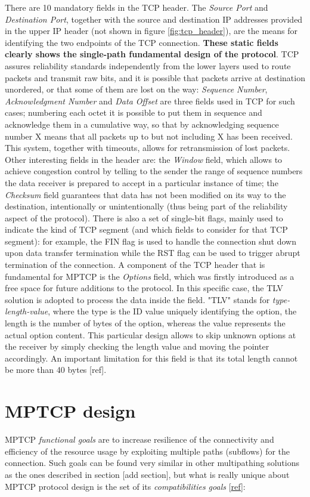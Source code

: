 There are 10 mandatory fields in the TCP header.
The \textit{Source Port} and \textit{Destination Port}, together with the source and destination IP addresses provided in the upper IP header (not shown in figure \ref{fig:tcp_header}), are the means for identifying the two endpoints of the TCP connection. \textbf{These static fields clearly shows the single-path fundamental design of the protocol}. 
TCP assures reliability standards independently from the lower layers used to route packets and transmit raw bits, and it is possible that packets arrive at destination unordered, or that some of them are lost on the way: \textit{Sequence Number}, \textit{Acknowledgment Number} and \textit{Data Offset} are three fields used in TCP for such cases; numbering each octet it is possible to put them in sequence and acknowledge them in a cumulative way, so that by acknowledging sequence number X means that all packets up to but not including X has been received. This system, together with timeouts, allows for retransmission of lost packets.
Other interesting fields in the header are: the \textit{Window} field, which allows to achieve congestion control by telling to the sender the range of sequence numbers the data receiver is prepared to accept in a particular instance of time; the \textit{Checksum} field guarantees that data has not been modified on its way to the destination, intentionally or unintentionally (thus being part of the reliability aspect of the protocol). There is also a set of single-bit flags, mainly used to indicate the kind of TCP segment (and which fields to consider for that TCP segment): for example, the FIN flag is used to handle the connection shut down upon data transfer termination while the RST flag can be used to trigger abrupt termination of the connection.
A component of the TCP header that is fundamental for MPTCP is the \textit{Options} field, which was firstly introduced as a free space for future additions to the protocol. In this specific case, the TLV solution is adopted to process the data inside the field. "TLV" stands for \textit{type-length-value}, where the type is the ID value uniquely identifying the option, the length is the number of bytes of the option, whereas the value represents the actual option content. This particular design allows to skip unknown options at the receiver by simply checking the length value and moving the pointer accordingly. An important limitation for this field is that its total length cannot be more than 40 bytes [ref].

\section{MPTCP design}
MPTCP \textit{functional goals} are to increase resilience of the connectivity and efficiency of the resource usage by exploiting multiple paths (subflows) for the connection.
Such goals can be found very similar in other multipathing solutions as the ones described in section [add section], but what is really unique about MPTCP protocol design is the set of its \textit{compatibilities goals} [\href{https://tools.ietf.org/html/rfc6182}{ref}]:

